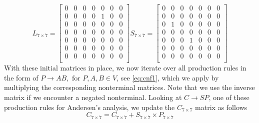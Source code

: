 \[
    L_{7\times 7} = 
    \begin{bmatrix}
        0 & 0 & 0 & 0 & 0 & 0 & 0 \\
        0 & 0 & 0 & 0 & 1 & 0 & 0 \\
        0 & 0 & 0 & 0 & 0 & 0 & 0 \\
        0 & 0 & 0 & 0 & 0 & 0 & 0 \\
        0 & 0 & 0 & 0 & 0 & 0 & 0 \\
        0 & 0 & 0 & 0 & 0 & 0 & 0 \\
        0 & 0 & 0 & 0 & 0 & 0 & 0 \\
    \end{bmatrix}
    S_{7\times 7} = 
    \begin{bmatrix}
        0 & 0 & 0 & 0 & 0 & 0 & 0 \\
        0 & 0 & 0 & 0 & 0 & 0 & 0 \\
        0 & 1 & 0 & 0 & 0 & 0 & 0 \\
        0 & 0 & 0 & 0 & 0 & 0 & 0 \\
        0 & 0 & 0 & 1 & 0 & 0 & 0 \\
        0 & 0 & 0 & 0 & 0 & 0 & 0 \\
        0 & 0 & 0 & 0 & 0 & 0 & 0 \\
    \end{bmatrix}
\]
With these initial matrices in place, we now iterate over all production rules in the form of $P\rightarrow AB, \textrm{ for } P,A,B \in V$, see \autoref{eq:cnf1}, which we apply by multiplying the corresponding nonterminal matrices. Note that we use the inverse matrix if we encounter a negated nonterminal. Looking at $C\rightarrow SP$, one of these production rules for Andersen's analysis, we update the $C_{7\times 7}$ matrix as follows $$C_{7\times 7} = C_{7\times 7} + S_{7\times 7} \times P_{7\times 7}$$
